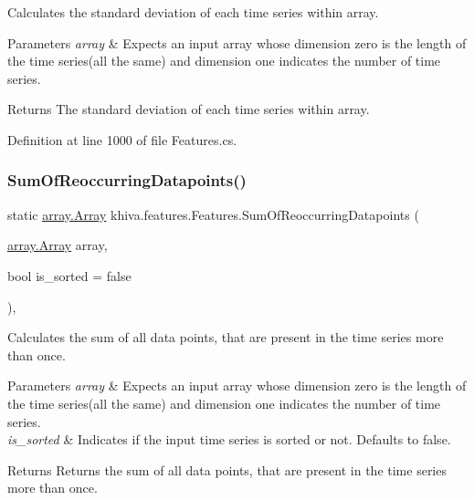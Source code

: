 Calculates the standard deviation of each time series within array. 


\begin{DoxyParams}{Parameters}
{\em array} & Expects an input array whose dimension zero is the length of the time series(all the same) and dimension one indicates the number of time series.\\
\hline
\end{DoxyParams}
\begin{DoxyReturn}{Returns}
The standard deviation of each time series within array.
\end{DoxyReturn}


Definition at line 1000 of file Features.\+cs.

\mbox{\label{classkhiva_1_1features_1_1_features_ad2943eb1b4ed0dff06ffd36b6eb3c858}} 
\subsubsection{\texorpdfstring{Sum\+Of\+Reoccurring\+Datapoints()}{SumOfReoccurringDatapoints()}}
{\footnotesize\ttfamily static \mbox{\hyperlink{classkhiva_1_1array_1_1_array}{array.\+Array}} khiva.\+features.\+Features.\+Sum\+Of\+Reoccurring\+Datapoints (\begin{DoxyParamCaption}\item[{\mbox{\hyperlink{classkhiva_1_1array_1_1_array}{array.\+Array}}}]{array,  }\item[{bool}]{is\+\_\+sorted = {\ttfamily false} }\end{DoxyParamCaption})\hspace{0.3cm}{\ttfamily [inline]}, {\ttfamily [static]}}



Calculates the sum of all data points, that are present in the time series more than once. 


\begin{DoxyParams}{Parameters}
{\em array} & Expects an input array whose dimension zero is the length of the time series(all the same) and dimension one indicates the number of time series.\\
\hline
{\em is\+\_\+sorted} & Indicates if the input time series is sorted or not. Defaults to false.\\
\hline
\end{DoxyParams}
\begin{DoxyReturn}{Returns}
Returns the sum of all data points, that are present in the time series more than once.
\end{DoxyReturn}


